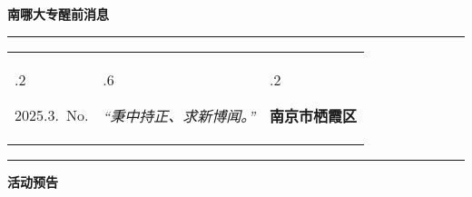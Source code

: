 \documentclass[letterpaper, 12pt]{article}
\begin{document}
\begin{center}
    \Huge\textbf{南哪大专醒前消息}
\end{center}
\vspace{4mm}
\hrule
\renewcommand\tabularxcolumn[1]{m{#1}}
\begin{tabularx}{\textwidth}{>{\hsize.2\hsize}X>{\hsize.6\hsize}X>{\hsize.2\hsize}X}
    \begin{flushleft}
        2025.3.\, No.
    \end{flushleft}
    &
    \begin{center}
        \textit{“秉中持正、求新博闻。”}
    \end{center}
    &
    \begin{flushright}
        \textbf{南京市栖霞区}
    \end{flushright}
\end{tabularx}
\vspace{-3.5mm}
\hrule
\vspace{4mm}
\centerline{\huge\textbf{活动预告}}
\end{document}

